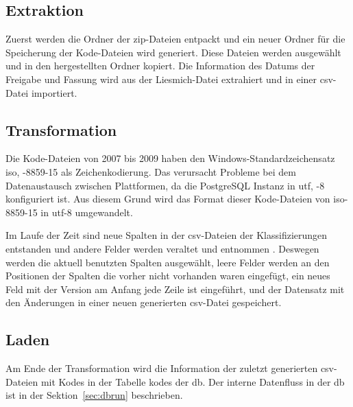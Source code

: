 \subsection{Extraktion} \label{subsec:extraction}

Zuerst werden die Ordner der \ac{zip}-Dateien entpackt und ein neuer Ordner für die Speicherung der Kode-Dateien wird generiert. Diese Dateien werden ausgewählt und in den hergestellten Ordner kopiert. Die Information des Datums der Freigabe und Fassung wird aus der Liesmich-Datei extrahiert und in einer \ac{csv}-Datei importiert.


\subsection{Transformation} \label{subsec:transf}

Die Kode-Dateien von 2007 bis 2009 haben den Windows-Standardzeichensatz \acl{iso}, -8859-15 als Zeichenkodierung. Das verursacht Probleme bei dem Datenaustausch zwischen Plattformen, da die PostgreSQL Instanz in \acl{utf}, -8 konfiguriert ist. Aus diesem Grund wird das Format dieser Kode-Dateien von \ac{iso}-8859-15 in \ac{utf}-8 umgewandelt.

Im Laufe der Zeit sind neue Spalten in der \ac{csv}-Dateien der Klassifizierungen entstanden und andere Felder werden veraltet und entnommen \cite{readme13, readme17}. Deswegen werden die aktuell benutzten Spalten ausgewählt, leere Felder werden an den Positionen der Spalten die vorher nicht vorhanden waren eingefügt, ein neues Feld mit der Version am Anfang jede Zeile ist eingeführt, und der Datensatz mit den Änderungen in einer neuen generierten \ac{csv}-Datei gespeichert.


\subsection{Laden} \label{subsec:load}

Am Ende der Transformation wird die Information der zuletzt generierten \ac{csv}-Dateien mit Kodes in der Tabelle \glqq\textsf{kodes}\grqq{} der \ac{db}. Der interne Datenfluss in der \ac{db} ist in der Sektion~\ref{sec:dbrun} beschrieben.